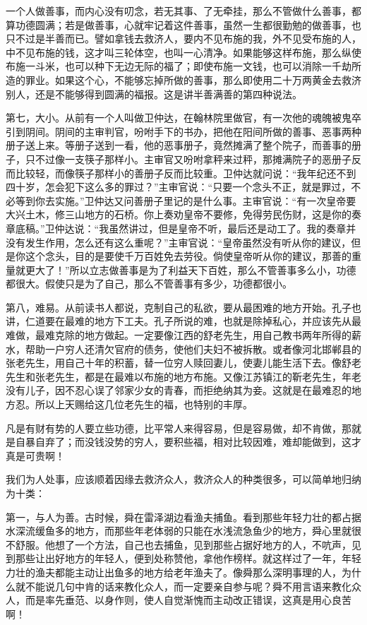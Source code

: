 \documentclass[12pt,UTF8]{ctexbook}
\begin{document}
一个人做善事，而内心没有叨念，若无其事、了无牵挂，那么不管做什么善事，都算功德圆满；若是做善事，心就牢记着这件善事，虽然一生都很勤勉的做善事，也只不过是半善而已。譬如拿钱去救济人，要内不见布施的我，外不见受布施的人，中不见布施的钱，这才叫三轮体空，也叫一心清净。如果能够这样布施，那么纵使布施一斗米，也可以种下无边无际的福了；即使布施一文钱，也可以消除一千劫所造的罪业。如果这个心，不能够忘掉所做的善事，那么即使用二十万两黄金去救济别人，还是不能够得到圆满的福报。这是讲半善满善的第四种说法。

第七，大小。从前有一个人叫做卫仲达，在翰林院里做官，有一次他的魂魄被鬼卒引到阴间。阴间的主审判官，吩咐手下的书办，把他在阳间所做的善事、恶事两种册子送上来。等册子送到一看，他的恶事册子，竟然摊满了整个院子，而善事的册子，只不过像一支筷子那样小。主审官又吩咐拿秤来过秤，那摊满院子的恶册子反而比较轻，而像筷子那样小的善册子反而比较重。卫仲达就问说：“我年纪还不到四十岁，怎会犯下这么多的罪过？”主审官说：“只要一个念头不正，就是罪过，不必等到你去实施。”卫仲达又问善册子里记的是什么事。主审官说：“有一次皇帝要大兴土木，修三山地方的石桥。你上奏劝皇帝不要修，免得劳民伤财，这是你的奏章底稿。”卫仲达说：“我虽然讲过，但是皇帝不听，最后还是动工了。我的奏章并没有发生作用，怎么还有这么重呢？”主审官说：“皇帝虽然没有听从你的建议，但是你这个念头，目的是要使千万百姓免去劳役。倘使皇帝听从你的建议，那善的重量就更大了！”所以立志做善事是为了利益天下百姓，那么不管善事多么小，功德都很大。假使只是为了自己，那么不管善事有多少，功德都很小。

第八，难易。从前读书人都说，克制自己的私欲，要从最困难的地方开始。孔子也讲，仁道要在最难的地方下工夫。孔子所说的难，也就是除掉私心，并应该先从最难做，最难克除的地方做起。一定要像江西的舒老先生，用自己教书两年所得的薪水，帮助一户穷人还清欠官府的债务，使他们夫妇不被拆散。或者像河北邯郸县的张老先生，用自己十年的积蓄，替一位穷人赎回妻儿，使妻儿能生活下去。像舒老先生和张老先生，都是在最难以布施的地方布施。又像江苏镇江的靳老先生，年老没有儿子，因不忍心误了邻家少女的青春，而拒绝纳其为妾。这就是在最难忍的地方忍。所以上天赐给这几位老先生的福，也特别的丰厚。

凡是有财有势的人要立些功德，比平常人来得容易，但是容易做，却不肯做，那就是自暴自弃了；而没钱没势的穷人，要积些福，相对比较因难，难却能做到，这才真是可贵啊！

我们为人处事，应该顺着因缘去救济众人，救济众人的种类很多，可以简单地归纳为十类：

第一，与人为善。古时候，舜在雷泽湖边看渔夫捕鱼。看到那些年轻力壮的都占据水深流缓鱼多的地方，而那些年老体弱的只能在水浅流急鱼少的地方，舜心里就很不舒服。他想了一个方法，自己也去捕鱼，见到那些占据好地方的人，不吭声，见到那些让出好地方的年轻人，便到处称赞他，拿他作榜样。就这样过了一年，年轻力壮的渔夫都能主动让出鱼多的地方给老年渔夫了。像舜那么深明事理的人，为什么就不能说几句中肯的话来教化众人，而一定要亲自参与呢？舜不用言语来教化众人，而是率先垂范、以身作则，使人自觉渐愧而主动改正错误，这真是用心良苦啊！
\end{document}
